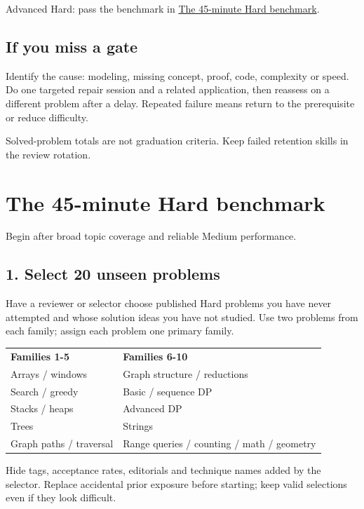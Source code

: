 \documentclass[11pt,letterpaper]{article}
\begin{document}
Advanced Hard: pass the benchmark in \hyperref[sec:23]{The 45-minute Hard benchmark}.

\subsection*{If you miss a gate}

Identify the cause: modeling, missing concept, proof, code, complexity or speed. Do one targeted repair session and a related application, then reassess on a different problem after a delay. Repeated failure means return to the prerequisite or reduce difficulty.

Solved-problem totals are not graduation criteria. Keep failed retention skills in the review rotation.

\section{The 45-minute Hard benchmark}\label{sec:23}

Begin after broad topic coverage and reliable Medium performance.

\subsection*{1. Select 20 unseen problems}

Have a reviewer or selector choose published Hard problems you have never attempted and whose solution ideas you have not studied. Use two problems from each family; assign each problem one primary family.

\begin{center}
\small
\begin{tabular}{>{\raggedright\arraybackslash}p{}>{\raggedright\arraybackslash}p{}}
\textbf{Families 1-5} & \textbf{Families 6-10} \\
Arrays / windows & Graph structure / reductions \\
Search / greedy & Basic / sequence DP \\
Stacks / heaps & Advanced DP \\
Trees & Strings \\
Graph paths / traversal & Range queries / counting / math / geometry \\
\end{tabular}
\end{center}

Hide tags, acceptance rates, editorials and technique names added by the selector. Replace accidental prior exposure before starting; keep valid selections even if they look difficult.
\end{document}
